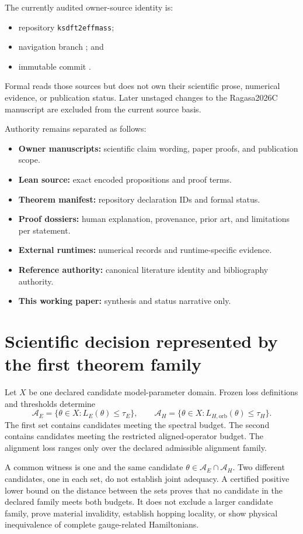 \documentclass[11pt]{article}
\begin{document}
The currently audited owner-source identity is:
\begin{itemize}
 \item repository \texttt{ksdft2effmass};
 \item navigation branch ; and
 \item immutable commit
 \texttt{}.
\end{itemize}
Formal reads those sources but does not own their scientific prose, numerical evidence,
or publication status. Later unstaged changes to the Ragasa2026C manuscript are excluded
from the current source basis.

Authority remains separated as follows:
\begin{itemize}
 \item \textbf{Owner manuscripts:} scientific claim wording, paper proofs, and publication scope.
 \item \textbf{Lean source:} exact encoded propositions and proof terms.
 \item \textbf{Theorem manifest:} repository declaration IDs and formal status.
 \item \textbf{Proof dossiers:} human explanation, provenance, prior art, and limitations per statement.
 \item \textbf{External runtimes:} numerical records and runtime-specific evidence.
 \item \textbf{Reference authority:} canonical literature identity and bibliography authority.
 \item \textbf{This working paper:} synthesis and status narrative only.
\end{itemize}

\section{Scientific decision represented by the first theorem family}

Let $X$ be one declared candidate model-parameter domain. Frozen loss definitions and
thresholds determine
\[
 \mathcal A_E=\{\theta\in X:L_E(\theta)\le\tau_E\},\qquad
 \mathcal A_H=\{\theta\in X:L_{H,\mathrm{orb}}(\theta)\le\tau_H\}.
\]
The first set contains candidates meeting the spectral budget. The second contains
candidates meeting the restricted aligned-operator budget. The alignment loss ranges
only over the declared admissible alignment family.

A common witness is one and the same candidate
$\theta\in\mathcal A_E\cap\mathcal A_H$. Two different candidates, one in each set, do
not establish joint adequacy. A certified positive lower bound on the distance between
the sets proves that no candidate in the declared family meets both budgets. It does not
exclude a larger candidate family, prove material invalidity, establish hopping
locality, or show physical inequivalence of complete gauge-related Hamiltonians.
\end{document}
